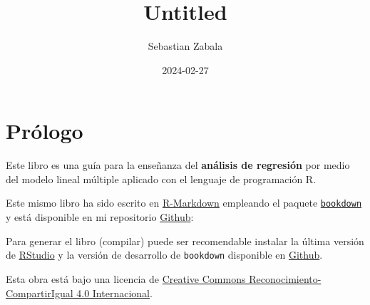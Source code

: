 \documentclass[
]{book}
\title{Untitled}
\author{Sebastian Zabala}
\date{2024-02-27}
\begin{document}
\maketitle

{
\setcounter{tocdepth}{1}
\tableofcontents
}
\hypertarget{pruxf3logo}{%
\chapter*{Prólogo}\label{pruxf3logo}}

Este libro es una guía para la enseñanza del \textbf{análisis de regresión} por medio del modelo lineal múltiple aplicado con el lenguaje de programación R.

Este mismo libro ha sido escrito en \href{http://rmarkdown.rstudio.com}{R-Markdown} empleando el paquete \href{https://bookdown.org/yihui/bookdown/}{\texttt{bookdown}} y está disponible en mi repositorio \href{https://github.com/sebastianZabala/libro_RLM}{Github}:

Para generar el libro (compilar) puede ser recomendable instalar la última versión de \href{(https://www.rstudio.com/products/rstudio/download/)}{RStudio} y la versión de desarrollo de \texttt{bookdown} disponible en \href{https://github.com/rstudio/bookdown}{Github}.

Esta obra está bajo una licencia de \href{https://creativecommons.org/licenses/by-sa/4.0/deed.es}{Creative Commons Reconocimiento-CompartirIgual 4.0 Internacional}.
\end{document}
